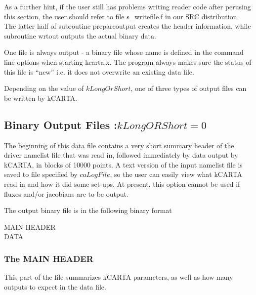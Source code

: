 \documentclass[12pt]{article}
\newcommand{\kc}{\textsf{kCARTA}\xspace}
\newcommand{\ttab}{\indent\indent}
\begin{document}
{{{As a further hint, if the user still has problems writing reader code after 
perusing this section, the user should refer to
file {\sf s\_writefile.f} in our {\sf SRC} distribution. The latter half of 
subroutine {\sf prepareoutput} creates the header information, while 
subroutine {\sf wrtout} outputs the actual binary data.

One file is always output - a binary file whose name is defined in
the command line options when starting kcarta.x. The program always
makes  sure the status of this file is ``new'' i.e. it does not
overwrite an existing data file. 

Depending on the value of $kLongOrShort$, one of three types of 
output files can be written by \kc. 

\subsection{Binary Output Files :$kLongORShort = 0$}

The beginning of this data file contains a very short summary header of the 
driver namelist file that was read in, followed immediately by data output by
\kc, in blocks of 10000 points.  A text version of the input namelist file 
is saved to file specified by $caLogFile$, so the user can easily view what 
\kc read in and how it did some set-ups. At present, this option cannot be 
used if fluxes and/or jacobians are to be output. 

The output binary file is in the following binary format

\smallskip
\ttab MAIN HEADER\\
\ttab DATA

\subsubsection{The MAIN HEADER}

This part of the file summarizes \kc parameters, as well as how many outputs
to expect in the data file. 

}}}
\end{document}
